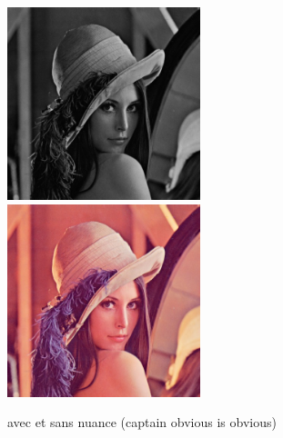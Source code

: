 \documentclass{article}
\begin{document}
\begin{figure}[h]
\includegraphics[width=0.50\textwidth]{img/grey.png}
\includegraphics[width=0.50\textwidth]{img/lena.jpg}
\caption{avec et sans nuance (captain obvious is obvious)}
\end{figure}
\newpage{}
\end{document}
